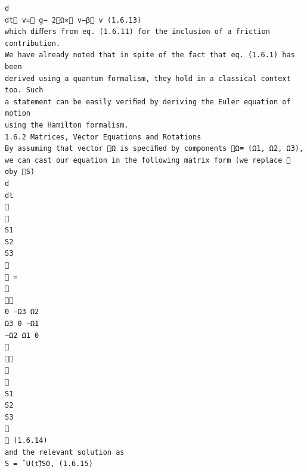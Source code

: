 \begin{verbatim}
d
dt⃗ v=⃗ g− 2⃗Ω×⃗ v−β⃗ v (1.6.13)
which diﬀers from eq. (1.6.11) for the inclusion of a friction contribution.
We have already noted that in spite of the fact that eq. (1.6.1) has been
derived using a quantum formalism, they hold in a classical context too. Such
a statement can be easily veriﬁed by deriving the Euler equation of motion
using the Hamilton formalism.
1.6.2 Matrices, Vector Equations and Rotations
By assuming that vector ⃗Ω is speciﬁed by components ⃗Ω≡ (Ω1, Ω2, Ω3),
we can cast our equation in the following matrix form (we replace ⃗ σby ⃗S)
d
dt


S1
S2
S3

 =


0 −Ω3 Ω2
Ω3 0 −Ω1
−Ω2 Ω1 0




S1
S2
S3

 (1.6.14)
and the relevant solution as
⃗S = ˆU(t)⃗S0, (1.6.15)
\end{verbatim}
